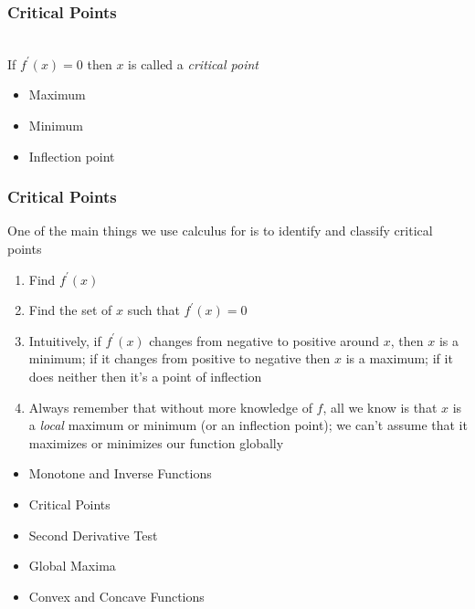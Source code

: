 \documentclass{beamer}
\numberwithin{equation}{section}
\begin{document}
\begin{frame}
\frametitle{Critical Points}

\ \\If $f^\prime(x)=0$ then $x$ is called a \textit{critical point}

\begin{itemize}
\item Maximum
\item Minimum
\item Inflection point
\end{itemize}

\begin{center}
  
\end{center}

\end{frame}



\begin{frame}
\frametitle{Critical Points}

One of the main things we use calculus for is to identify and classify critical points \pause

\begin{enumerate}
\item Find $f^\prime(x)$ \pause
\item Find the set of $x$ such that $f^\prime(x)=0$ \pause
\item Intuitively, if $f^\prime(x)$ changes from negative to positive around $x$, then $x$ is a minimum; if it changes from positive to negative then $x$ is a maximum; if it does neither then it's a point of inflection \pause
\item Always remember that without more knowledge of $f$, all we know is that $x$ is a \textit{local} maximum or minimum (or an inflection point); we can't assume that it maximizes or minimizes our function globally
\end{enumerate}

\end{frame}



\begin{frame}

\begin{itemize}
\item \textcolor{mygray}{Monotone and Inverse Functions}
\item \textcolor{mygray}{Critical Points}
\item \textcolor{myblack}{Second Derivative Test}
\item \textcolor{mygray}{Global Maxima}
\item \textcolor{mygray}{Convex and Concave Functions}
\end{itemize}

\end{frame}
\end{document}
